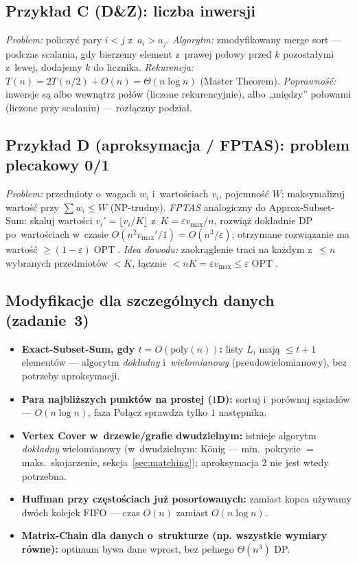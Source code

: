 \documentclass[11pt,a4paper]{article}
\theoremstyle{plain}
\theoremstyle{definition}
\newcommand{\eps}{\varepsilon}
\DeclareMathOperator{\OPT}{OPT}
\begin{document}
\subsection{Przykład C (D\&Z): liczba inwersji}
\emph{Problem:} policzyć pary $i<j$ z~$a_i>a_j$. \emph{Algorytm:} zmodyfikowany merge sort --- podczas
scalania, gdy bierzemy element z~prawej połowy przed $k$ pozostałymi z~lewej, dodajemy $k$ do licznika.
\emph{Rekurencja:} $T(n)=2T(n/2)+O(n)=\Theta(n\log n)$ (Master Theorem). \emph{Poprawność:} inwersje są
albo wewnątrz połów (liczone rekurencyjnie), albo „między'' połowami (liczone przy scalaniu) --- rozłączny
podział.

\subsection{Przykład D (aproksymacja / FPTAS): problem plecakowy 0/1}
\emph{Problem:} przedmioty o~wagach $w_i$ i~wartościach $v_i$, pojemność $W$; maksymalizuj wartość przy
$\sum w_i\le W$ (NP\hbox{-}trudny). \emph{FPTAS} analogiczny do Approx-Subset-Sum: skaluj wartości
$v_i'=\lfloor v_i/K\rfloor$ z~$K=\eps v_{\max}/n$, rozwiąż dokładnie DP po~wartościach w~czasie
$O(n^2 v_{\max}'/1)=O(n^3/\eps)$; otrzymane rozwiązanie ma wartość $\ge(1-\eps)\OPT$. \emph{Idea dowodu:}
zaokrąglenie traci na każdym z~$\le n$ wybranych przedmiotów $<K$, łącznie $<nK=\eps v_{\max}\le\eps\OPT$.

\subsection{Modyfikacje dla szczególnych danych (zadanie~3)}
\begin{itemize}[leftmargin=1.4em]
\item \textbf{Exact-Subset-Sum, gdy $t=O(\mathrm{poly}(n))$:} listy $L_i$ mają $\le t+1$ elementów ---
algorytm \emph{dokładny} i~\emph{wielomianowy} (pseudowielomianowy), bez potrzeby aproksymacji.
\item \textbf{Para najbliższych punktów na prostej ($1$D):} sortuj i~porównuj sąsiadów --- $O(n\log n)$,
faza Połącz sprawdza tylko $1$ następnika.
\item \textbf{Vertex Cover w~drzewie/grafie dwudzielnym:} istnieje algorytm \emph{dokładny} wielomianowy
(w~dwudzielnym: König --- min.\ pokrycie $=$ maks.\ skojarzenie, sekcja~\ref{sec:matching}); aproksymacja
$2$ nie jest wtedy potrzebna.
\item \textbf{Huffman przy częstościach już posortowanych:} zamiast kopca używamy dwóch kolejek FIFO ---
czas $O(n)$ zamiast $O(n\log n)$.
\item \textbf{Matrix-Chain dla danych o~strukturze (np. wszystkie wymiary równe):} optimum bywa dane wprost,
bez pełnego $\Theta(n^3)$ DP.
\end{itemize}
\end{document}
